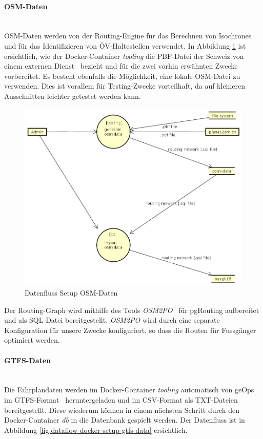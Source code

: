 \paragraph{OSM-Daten}~\\
\acs{OSM}-Daten werden von der \gls{Routing-Engine} für das Berechnen von \glspl{Isochrone} und für das Identifizieren von \acs{ÖV}-Haltestellen verwendet.
In Abbildung \ref{fig:dataflow-docker-setup-osm-data} ist ersichtlich, wie der Docker-Container \emph{tooling} die \acs{PBF}-Datei der Schweiz von einem externen Dienst~\cite{planet_osm_ch} bezieht und für die zwei vorhin erwähnten Zwecke vorbereitet.
Es besteht ebenfalls die Möglichkeit, eine lokale \acs{OSM}-Datei zu verwenden.
Dies ist vorallem für Testing-Zwecke vorteilhaft, da auf kleineren Ausschnitten leichter getestet werden kann.

\begin{figure}[ht]
    \centering
    \includegraphics[width=0.8\linewidth]{projectdoc/img/dataflow-docker-setup-osm-data.png}
    \caption[Datenfluss Setup OSM-Daten]{Datenfluss Setup OSM-Daten}
    \label{fig:dataflow-docker-setup-osm-data}
\end{figure}

Der \gls{Routing-Graph} wird mithilfe des Tools \emph{OSM2PO}~\cite{OSM2PO} für pgRouting aufbereitet und als SQL-Datei bereitgestellt.
\emph{OSM2PO} wird durch eine separate Konfiguration für unsere Zwecke konfiguriert, so dass die Routen für Fussgänger optimiert werden.

\paragraph{GTFS-Daten}~\\
Die Fahrplandaten werden im Docker-Container \emph{tooling} automatisch von geOps~\cite{geops_fahrplandaten} im GTFS-Format~\cite{gtfs_spec} heruntergeladen und im CSV-Format als TXT-Dateien bereitgestellt.
Diese wiederum können in einem nächsten Schritt durch den Docker-Container \emph{db} in die Datenbank gespielt werden.
Der Datenfluss ist in Abbildung \ref{fig:dataflow-docker-setup-gtfs-data} ersichtlich.

